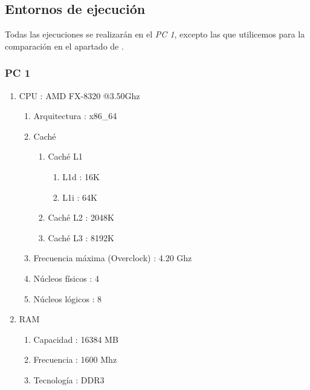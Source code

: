 \documentclass[12pt,spanish]{article}
\begin{document}
\subsection{Entornos de ejecución}
\label{sec:entorno}
Todas las ejecuciones se realizarán en el \emph{PC 1}, excepto las que utilicemos para la comparación en el apartado de \textit{}.
\subsubsection{PC 1}
\label{sec:pc1}
\begin{enumerate}
	\item CPU : AMD FX-8320 @3.50Ghz
	\begin{enumerate}
		\item Arquitectura : x86\_64		
		\item Caché
		\begin{enumerate}
			\item Caché L1
			\begin{enumerate}
				\item L1d : 16K
				\item L1i : 64K		
			\end{enumerate}
			\item Caché L2 : 2048K
			\item Caché L3 : 8192K
		\end{enumerate}
		\item Frecuencia máxima (Overclock) : 4.20 Ghz
		\item Núcleos físicos : 4
		\item Núcleos lógicos : 8
	\end{enumerate}
	\item RAM
	\begin{enumerate}
		\item Capacidad : 16384 MB
		\item Frecuencia : 1600 Mhz
		\item Tecnología : DDR3
	\end{enumerate}
\end{enumerate}
\end{document}
